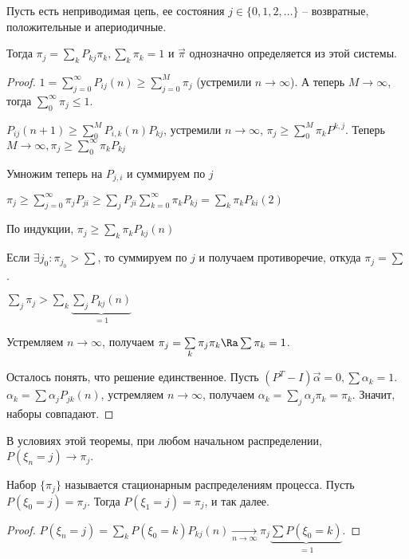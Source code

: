 \begin{theorem}
Пусть есть неприводимая цепь, ее состояния $j \in \{0, 1, 2, \dots \}$ -- возвратные, положительные и апериодичные.

Тогда $\pi_j = \sum\limits_k P_{kj} \pi_k, \sum\limits_k \pi_k = 1$ и $\overrightarrow{\pi}$ однозначно определяется из этой системы.
\end{theorem}
\begin{proof}
\TODO

$1 = \sum\limits_{j=0}^\infty P_{ij}(n) \geq \sum\limits_{j=0}^M \pi_j$ (устремили $n \to \infty$). 
А теперь $M \to \infty$, тогда $\sum\limits_0^\infty \pi_j \leq 1$.

$P_{ij} (n + 1) \geq \sum\limits_0^M P_{i,k}(n)P_{kj}$, устремили $n \to \infty$, $\pi_j \geq \sum\limits_0^M \pi_k P^{k, j}$. Теперь $M \to \infty, \pi_j \geq \sum\limits_0^\infty \pi_k P_{kj}$

Умножим теперь на $P_{j,i}$ и суммируем по $j$

$\pi_j \geq \sum\limits_{j=0}^\infty \pi_j P_{ji} \geq \sum\limits_j P_{ji} \sum\limits_{k=0}^\infty \pi_k P_{kj} = \sum\limits_k \pi_k P_{ki}(2)$

По индукции, $\pi_j \geq \sum\limits_k \pi_k P_{kj}(n)$

Если $\exists j_0 \colon \pi_{j_0} > \sum$, то суммируем по $j$ и получаем противоречие, откуда $\pi_j = \sum$.

$\sum\limits_j \pi_j > \sum\limits_k  \underbrace{\sum\limits_j P_{kj}(n)}_{=1}$

Устремляем $n \to \infty$, получаем $\pi_j = \sum\limits_k \pi_j \pi_k \Ra \sum \pi_k = 1$.


Осталось понять, что решение единственное. 
Пусть $(P^T - I) \overrightarrow{\alpha} = 0, \sum \alpha_k = 1$.
$\alpha_k = \sum\alpha_j P_{jk}(n)$, устремляем $n \to \infty$, получаем $\alpha_k = \sum_j \alpha_j \pi_k = \pi_k$.
Значит, наборы совпадают.

\TODO
\end{proof}

\begin{conseq}
В условиях этой теоремы, при любом начальном распределении, $P(\xi_n = j) \to \pi_j$.

Набор $\{\pi_j\}$ называется стационарным распределениям процесса. Пусть $P(\xi_0 = j) = \pi_j$. Тогда $P(\xi_1 = j) = \pi_j$, и так далее.
\end{conseq}
\begin{proof}
$P(\xi_n = j) = \sum\limits_k P(\xi_0 = k) P_{kj}(n) \xrightarrow[n \to \infty]{} \pi_j \underbrace{\sum P(\xi_0 = k)}_{=1}$.
\end{proof}


